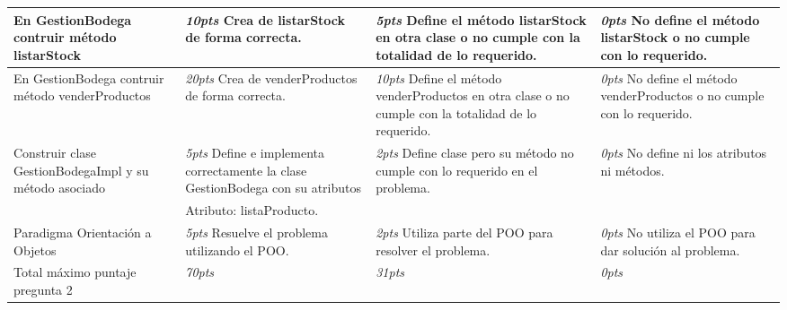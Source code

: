 \documentclass[10pt]{article}
\begin{document}
\begin{table}[!ht]
{\begin{center}
\begin{tabular}{|p{3.5cm}|p{3.5cm}|p{3.5cm}|p{3.5cm}|}
                En GestionBodega contruir m\'etodo {listarStock}  &
                \emph{10pts} Crea de {listarStock} de forma correcta. &
                \emph{  5pts} Define el m\'etodo {listarStock} en otra clase o no cumple con la totalidad de lo requerido. &
                \emph{  0pts} No define el m\'etodo {listarStock} o no cumple con lo requerido. \\ \hline

                En GestionBodega contruir m\'etodo {venderProductos}  &
                \emph{20pts} Crea de {venderProductos} de forma correcta. &
                \emph{  10pts} Define el m\'etodo {venderProductos} en otra clase o no cumple con la totalidad de lo requerido. &
                \emph{  0pts} No define el m\'etodo {venderProductos} o no cumple con lo requerido. \\ \hline

                Construir clase GestionBodegaImpl y su m\'etodo asociado &
                \emph{5pts} Define e implementa correctamente la clase GestionBodega con su atributos  &
                \emph{2pts} Define clase pero su m\'etodo no cumple con lo requerido en el problema. &
                \emph{  0pts} No define ni los atributos ni m\'etodos. \\
                & Atributo: listaProducto. & & \\ \hline

                Paradigma Orientaci\'on a Objetos  &
                \emph{5pts} Resuelve el problema utilizando el POO. &
                \emph{2pts} Utiliza parte del POO para resolver el problema. &
                \emph{0pts} No utiliza el POO para dar soluci\'on al problema.\\ \hline
                Total m\'aximo puntaje pregunta 2 &
                \emph{70pts} &
                \emph{31pts} &
                \emph{  0pts} \\ \hline
            \end{tabular}
        \end{center}}
     \end{table}
\end{document}
